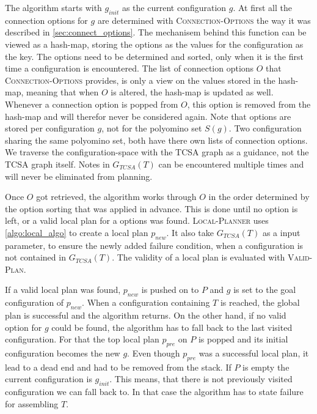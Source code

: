 The algorithm starts with $g_{init}$ as the current configuration $g$.
At first all the connection options for $g$ are determined with {\scshape Connection-Options} the way it was described in \autoref{sec:connect_options}.
The mechanisem behind this function can be viewed as a hash-map, storing the options as the values for the configuration as the key.
The options need to be determined and sorted, only when it is the first time a configuration is encountered.
The list of connection options $O$ that {\scshape Connection-Options} provides, is only a view on the values stored in the hash-map, meaning that when $O$ is altered, the hash-map is updated as well.
Whenever a connection option is popped from $O$, this option is removed from the hash-map and will therefor never be considered again.
Note that options are stored per configuration $g$, not for the polyomino set $S(g)$.
Two configuration sharing the same polyomino set, both have there own lists of connection options.
We traverse the configuration-space with the TCSA graph as a guidance, not the TCSA graph itself.
Notes in $G_{TCSA}(T)$ can be encountered multiple times and will never be eliminated from planning.

Once $O$ got retrieved, the algorithm works through $O$ in the order determined by the option sorting that was applied in advance.
This is done until no option is left, or a valid local plan for a options was found.
{\scshape Local-Planner} uses \autoref{algo:local_algo} to create a local plan $p_{new}$.
It also take $G_{TCSA}(T)$ as a input parameter, to ensure the newly added failure condition, when a configuration is not contained in $G_{TCSA}(T)$.
The validity of a local plan is evaluated with {\scshape Valid-Plan}.

If a valid local plan was found, $p_{new}$ is pushed on to $P$ and $g$ is set to the goal configuration of $p_{new}$.
When a configuration containing $T$ is reached, the global plan is successful and the algorithm returns.
On the other hand, if no valid option for $g$ could be found, the algorithm has to fall back to the last visited configuration.
For that the top local plan $p_{pre}$ on $P$ is popped and its initial configuration becomes the new $g$.
Even though $p_{pre}$ was a successful local plan, it lead to a dead end and had to be removed from the stack.
If $P$ is empty the current configuration is $g_{init}$.
This means, that there is not previously visited configuration we can fall back to.
In that case the algorithm has to state failure for assembling $T$.


